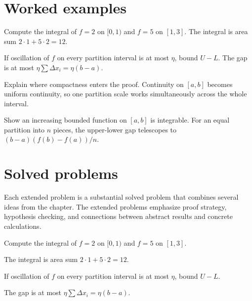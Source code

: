 \section{Worked examples}

\begin{example}\label{ex:ii10-worked-01}
Compute the integral of $f=2$ on $[0,1)$ and $f=5$ on $[1,3]$. The integral is area sum $2\cdot1+5\cdot2=12$.
\end{example}

\begin{example}\label{ex:ii10-worked-02}
If oscillation of $f$ on every partition interval is at most $\eta$, bound $U-L$. The gap is at most $\eta\sum\Delta x_i=\eta(b-a)$.
\end{example}

\begin{example}\label{ex:ii10-worked-03}
Explain where compactness enters the proof. Continuity on $[a,b]$ becomes uniform continuity, so one partition scale works simultaneously across the whole interval.
\end{example}

\begin{example}\label{ex:ii10-worked-04}
Show an increasing bounded function on $[a,b]$ is integrable. For an equal partition into $n$ pieces, the upper-lower gap telescopes to $(b-a)(f(b)-f(a))/n$.
\end{example}

\section{Solved problems}
Each extended problem is a substantial solved problem that combines several ideas from the chapter. The extended problems emphasize proof strategy, hypothesis checking, and connections between abstract results and concrete calculations.

\begin{problem}\label{prob:ii10-problem-01}
Compute the integral of $f=2$ on $[0,1)$ and $f=5$ on $[1,3]$.
\end{problem}
\begin{solution}
The integral is area sum $2\cdot1+5\cdot2=12$.
\end{solution}

\begin{problem}\label{prob:ii10-problem-02}
If oscillation of $f$ on every partition interval is at most $\eta$, bound $U-L$.
\end{problem}
\begin{solution}
The gap is at most $\eta\sum\Delta x_i=\eta(b-a)$.
\end{solution}

